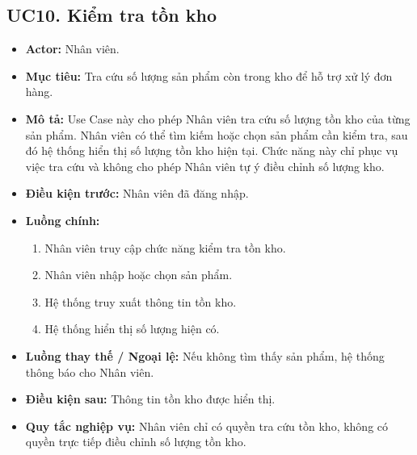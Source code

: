 \documentclass[12pt,a4paper]{article}
\begin{document}

\subsection*{UC10. Kiểm tra tồn kho}

\begin{itemize}

 \item \textbf{Actor:} Nhân viên.

 \item \textbf{Mục tiêu:} Tra cứu số lượng sản phẩm còn trong kho để hỗ trợ xử lý đơn hàng.

 \item \textbf{Mô tả:} Use Case này cho phép Nhân viên tra cứu số lượng tồn kho của từng sản phẩm. Nhân viên có thể tìm kiếm hoặc chọn sản phẩm cần kiểm tra, sau đó hệ thống hiển thị số lượng tồn kho hiện tại. Chức năng này chỉ phục vụ việc tra cứu và không cho phép Nhân viên tự ý điều chỉnh số lượng kho.

 \item \textbf{Điều kiện trước:} Nhân viên đã đăng nhập.

 \item \textbf{Luồng chính:}

 \begin{enumerate}

  \item Nhân viên truy cập chức năng kiểm tra tồn kho.

  \item Nhân viên nhập hoặc chọn sản phẩm.

  \item Hệ thống truy xuất thông tin tồn kho.

  \item Hệ thống hiển thị số lượng hiện có.

 \end{enumerate}

 \item \textbf{Luồng thay thế / Ngoại lệ:} Nếu không tìm thấy sản phẩm, hệ thống thông báo cho Nhân viên.

 \item \textbf{Điều kiện sau:} Thông tin tồn kho được hiển thị.

 \item \textbf{Quy tắc nghiệp vụ:} Nhân viên chỉ có quyền tra cứu tồn kho, không có quyền trực tiếp điều chỉnh số lượng tồn kho.

\end{itemize}
\end{document}
